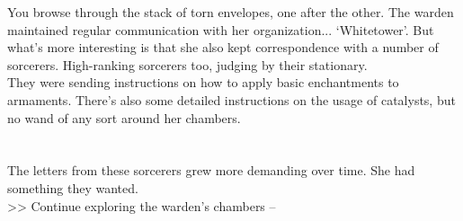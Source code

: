 You browse through the stack of torn envelopes, one after the other. The warden maintained regular communication with her organization... ‘Whitetower’. But what’s more interesting is that she also kept correspondence with a number of sorcerers. High-ranking sorcerers too, judging by their stationary.\\

They were sending instructions on how to apply basic enchantments to armaments. There’s also some detailed instructions on the usage of catalysts, but no wand of any sort around her chambers.\\
\\
\\

The letters from these sorcerers grew more demanding over time. She had something they wanted.\\

>> Continue exploring the warden’s chambers -- 